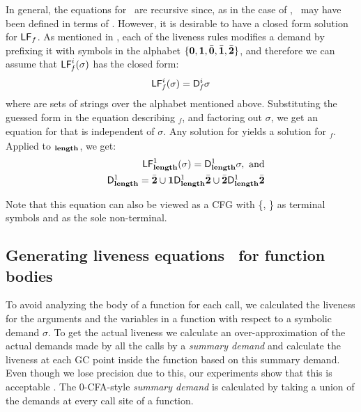 \documentclass[9pt]{sigplanconf}
\newcommand{\comment}[1]{{\color{Myblue}{(#1)}}}
\begin{document}
In general, the equations for  \Lfonly\ are recursive since, as in the
case  of  \length,  \  may   have  been  defined  in  terms  of
.  However,  it is desirable  to have a  closed form
solution for $\mathsf{LF}_{\mathit \mathit{f}}$.  As mentioned in \cite{asati14lgc},
each  of the liveness  rules modifies  a demand  by prefixing  it with
symbols  in the  alphabet  $\lbrace \mathbf{0},  \mathbf{1},\bar{\mathbf{0}}, \bar{\mathbf{1}},  \bar{\mathbf{2}}
\rbrace$, and therefore we can assume that $\mathsf{LF}_{\mathit f}^{i}( {\mathit \sigma})$ has the
closed form:
\begin{eqnarray}
\label{eq:LF:DI}
  \mathsf{LF}_{\mathit f}^{i}( {\mathit \sigma}) = \mathsf{D}_{\mathit f}^{i}\sigma
\end{eqnarray}
where  are sets of strings over the alphabet mentioned above.
Substituting   the   guessed   form   in   the   equation   describing
\Lfonly$_{\mathit f}$, and factoring  out $\sigma$, we get an equation
for   that  is  independent of  $\sigma$.   Any solution  for
  yields a  solution for  \Lfonly$_{\mathit f}$.   Applied to
\Lfonly$_{\mathit {\mathbf{length}}}$, we get:
  \begin{eqnarray*}
&&  \mathsf{LF}_{\mathit {\mathbf{length}} }^{1}( {\mathit \sigma}) = \mathsf{D}_{\mathit {\mathbf{length}}}^{1}\sigma,~\mbox{and}\\
&&   \mathsf{D}_{\mathit {\mathbf{length}}}^{1} = \bar{\mathbf{2}} \cup \mathbf{1}\mathsf{D}_{\mathit {\mathbf{length}}}^{1}\bar{\mathbf{2}} 
       \cup \bar{\mathbf{2}}\mathsf{D}_{\mathit {\mathbf{length}}}^{1}{\bar{\mathbf{2}}}
  \end{eqnarray*}

Note that this equation can also be viewed as a CFG with \{\acdr,
\cbar\} as terminal symbols and  as the sole
non-terminal.

\subsection{Generating liveness equations \Lv\  for function bodies}
\label{sec:bodylivenessbodies}

To avoid analyzing the body of a function for each call, we calculated
the liveness  for the arguments and  the variables in  a function with
respect to a symbolic demand  $\sigma$.  To get the actual liveness we
calculate an over-approximation of the  actual demands made by all the
calls by a {\em summary demand}  and calculate the liveness at each GC
point inside the  function based on this summary  demand.  Even though
we  lose precision  due to  this, our  experiments show  that  this is
acceptable  \comment{Is  this  claim  true?}.   The  0-CFA-style  {\em
  summary demand}  is calculated by taking  a union of  the demands at
every call site of a function.
\end{document}

